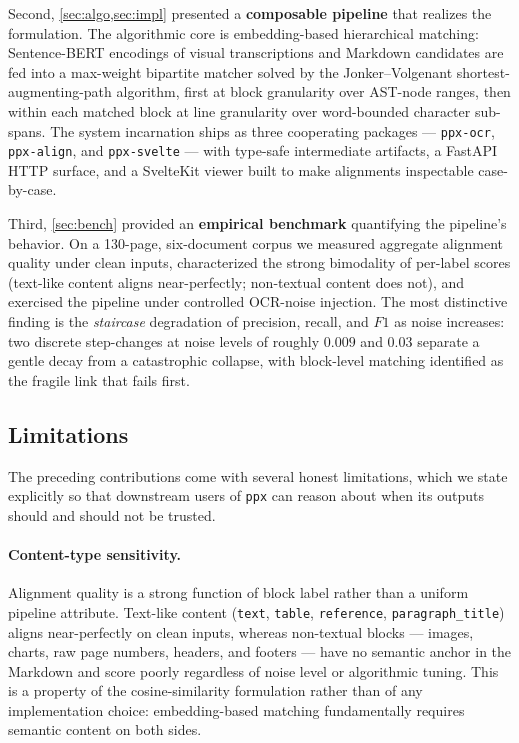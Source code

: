 \documentclass{article}
\theoremstyle{definition}
\begin{document}
Second, \cref{sec:algo,sec:impl} presented a \textbf{composable
      pipeline} that realizes the formulation.  The algorithmic core is
embedding-based hierarchical matching: Sentence-BERT encodings of
visual transcriptions and Markdown candidates are fed into a
max-weight bipartite matcher solved by the Jonker--Volgenant
shortest-augmenting-path algorithm, first at block granularity over
AST-node ranges, then within each matched block at line granularity
over word-bounded character sub-spans.  The system incarnation ships
as three cooperating packages --- \texttt{ppx-ocr},
\texttt{ppx-align}, and \texttt{ppx-svelte} --- with type-safe
intermediate artifacts, a FastAPI HTTP surface, and a SvelteKit
viewer built to make alignments inspectable case-by-case.

Third, \cref{sec:bench} provided an \textbf{empirical benchmark}
quantifying the pipeline's behavior.  On a 130-page,
six-document corpus we measured aggregate alignment quality under
clean inputs, characterized the strong bimodality of per-label
scores (text-like content aligns near-perfectly; non-textual content
does not), and exercised the pipeline under controlled OCR-noise
injection.  The most distinctive finding is the \emph{staircase}
degradation of precision, recall, and $F1$ as noise increases: two
discrete step-changes at noise levels of roughly $0.009$ and $0.03$
separate a gentle decay from a catastrophic collapse, with
block-level matching identified as the fragile link that fails
first.

\subsection{Limitations}

The preceding contributions come with several honest limitations,
which we state explicitly so that downstream users of \texttt{ppx}
can reason about when its outputs should and should not be trusted.

\paragraph{Content-type sensitivity.}
Alignment quality is a strong function of block label rather than a
uniform pipeline attribute.  Text-like content (\texttt{text},
\texttt{table}, \texttt{reference}, \texttt{paragraph\_title}) aligns
near-perfectly on clean inputs, whereas non-textual blocks --- images,
charts, raw page numbers, headers, and footers --- have no semantic
anchor in the Markdown and score poorly regardless of noise level or
algorithmic tuning.  This is a property of the cosine-similarity
formulation rather than of any implementation choice: embedding-based
matching fundamentally requires semantic content on both sides.
\end{document}
